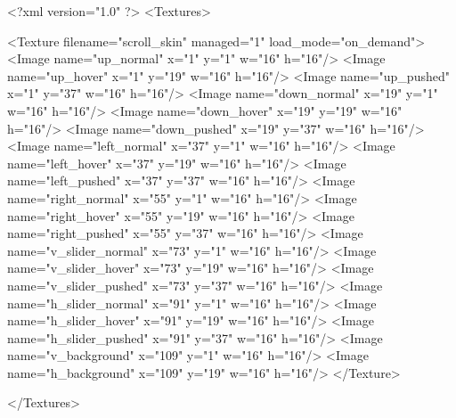 <?xml version="1.0" ?>
<Textures>

	<Texture filename="scroll_skin" managed="1" load_mode="on_demand">
		<Image name="up_normal" x="1" y="1" w="16" h="16"/>
		<Image name="up_hover" x="1" y="19" w="16" h="16"/>
		<Image name="up_pushed" x="1" y="37" w="16" h="16"/>
		<Image name="down_normal" x="19" y="1" w="16" h="16"/>
		<Image name="down_hover" x="19" y="19" w="16" h="16"/>
		<Image name="down_pushed" x="19" y="37" w="16" h="16"/>
		<Image name="left_normal" x="37" y="1" w="16" h="16"/>
		<Image name="left_hover" x="37" y="19" w="16" h="16"/>
		<Image name="left_pushed" x="37" y="37" w="16" h="16"/>
		<Image name="right_normal" x="55" y="1" w="16" h="16"/>
		<Image name="right_hover" x="55" y="19" w="16" h="16"/>
		<Image name="right_pushed" x="55" y="37" w="16" h="16"/>
		<Image name="v_slider_normal" x="73" y="1" w="16" h="16"/>
		<Image name="v_slider_hover" x="73" y="19" w="16" h="16"/>
		<Image name="v_slider_pushed" x="73" y="37" w="16" h="16"/>
		<Image name="h_slider_normal" x="91" y="1" w="16" h="16"/>
		<Image name="h_slider_hover" x="91" y="19" w="16" h="16"/>
		<Image name="h_slider_pushed" x="91" y="37" w="16" h="16"/>
		<Image name="v_background" x="109" y="1" w="16" h="16"/>
		<Image name="h_background" x="109" y="19" w="16" h="16"/>
	</Texture>
	
</Textures>
